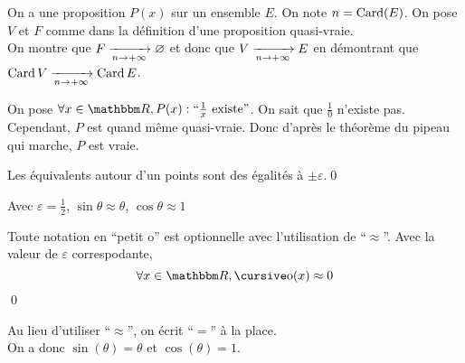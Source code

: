 \begin{prv}
	On a une proposition $P(x)$ sur un ensemble $E$. On note $n = \operatorname{Card}(E)$. On pose $V$ et $F$ comme dans la définition d'une proposition quasi-vraie.\\
	On montre que $F \xrightarrow[n\to +\infty]{} \varnothing$ et donc que $V \xrightarrow[n \to +\infty]{} E$ en démontrant que $\operatorname{Card}{V} \xrightarrow[n\to +\infty]{} \operatorname{Card}{E}$.
	\renewcommand{\qedsymbol}{}
\end{prv}

\begin{exm}
	On pose $\forall x \in \R, P(x) : ``\frac{1}{x} \text{ existe}"$.
	On sait que $\frac{1}{0}$ n'existe pas.
	Cependant, $P$ est quand même quasi-vraie.
	Donc d'après le théorème du pipeau qui marche, $P$ est vraie.
\end{exm}

\begin{prop}
	Les équivalents autour d'un points sont des égalités à $\pm \varepsilon$.\qed
\end{prop}

\begin{exm}
	Avec $\varepsilon = \frac{1}{2}$, $\sin\theta \approx \theta$, $\cos\theta \approx 1$
\end{exm}

\begin{crlr}
	Toute notation en ``petit o'' est optionnelle avec l'utilisation de ``$\approx$''. Avec la valeur de $\varepsilon$ correspodante, \[
		\forall x \in \R, \po(x) \approx 0
	\] \qed
\end{crlr}

\begin{rmk}
	[Notation]
	Au lieu d'utiliser ``$\approx$'', on écrit ``$=$'' à la place.\\
	On a donc $\sin(\theta) = \theta$ et $\cos(\theta) = 1$.
\end{rmk}
